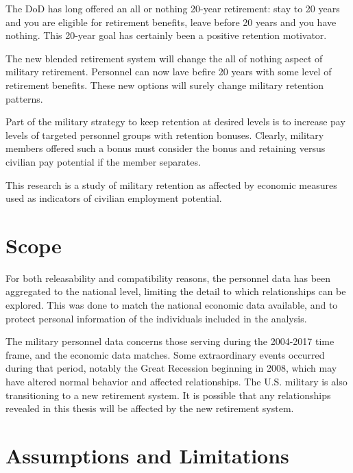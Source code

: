 \documentclass[12pt,letterpaper,toc=flat,oneside]{report}
\theoremstyle{definition}
\theoremstyle{definition}
\theoremstyle{definition}
\theoremstyle{remark}
\begin{document}
The DoD has long offered an all or nothing 20-year retirement: stay to
20 years and you are eligible for retirement benefits, leave before 20
years and you have nothing. This 20-year goal has certainly been a
positive retention motivator.

The new blended retirement system will change the all of nothing aspect
of military retirement. Personnel can now lave befire 20 years with some
level of retirement benefits. These new options will surely change
military retention patterns.

Part of the military strategy to keep retention at desired levels is to
increase pay levels of targeted personnel groups with retention bonuses.
Clearly, military members offered such a bonus must consider the bonus
and retaining versus civilian pay potential if the member separates.

This research is a study of military retention as affected by economic
measures used as indicators of civilian employment potential.

\hypertarget{scope}{%
\section{Scope}\label{scope}}

For both releasability and compatibility reasons, the personnel data has
been aggregated to the national level, limiting the detail to which
relationships can be explored. This was done to match the national
economic data available, and to protect personal information of the
individuals included in the analysis.

The military personnel data concerns those serving during the 2004-2017
time frame, and the economic data matches. Some extraordinary events
occurred during that period, notably the Great Recession beginning in
2008, which may have altered normal behavior and affected relationships.
The U.S. military is also transitioning to a new retirement system. It
is possible that any relationships revealed in this thesis will be
affected by the new retirement system.

\hypertarget{assumptions-and-limitations}{%
\section{Assumptions and
Limitations}\label{assumptions-and-limitations}}
\end{document}
